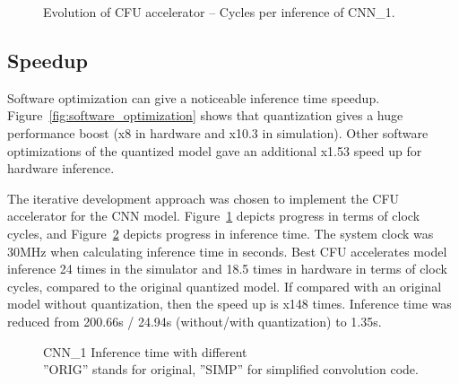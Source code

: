 \begin{figure}[h!]
    \begin{center}
     \scalebox{0.8}{
        
     }
    \end{center}
    \caption{Evolution of CFU accelerator -- Cycles per inference of CNN\_1.}
    \label{fig:cfu_cycles_evolution}
\end{figure}


\subsection{Speedup}
Software optimization can give a noticeable inference time speedup. Figure~\ref{fig:software_optimization} shows that quantization gives a huge performance boost (x8 in hardware and x10.3 in simulation). Other software optimizations of the quantized model gave an additional x1.53 speed up for hardware inference. 

The iterative development approach was chosen to implement the CFU accelerator for the CNN model. Figure~\ref{fig:cfu_cycles_evolution} depicts progress in terms of clock cycles, and Figure~\ref{fig:cfu_inference_time} depicts progress in inference time. The system clock was 30MHz when calculating inference time in seconds. Best CFU accelerates model inference 24 times in the simulator and 18.5 times in hardware in terms of clock cycles, compared to the original quantized model. If compared with an original model without quantization, then the speed up is x148 times. Inference time was reduced from 200.66s / 24.94s (without/with quantization) to 1.35s.


\begin{figure}[h!]
    \begin{center}
    \scalebox{1.0}{
        
    }
    \end{center}
    \caption{CNN\_1 Inference time with different\\''ORIG'' stands for original, ''SIMP'' for simplified convolution code.}
    \label{fig:cfu_inference_time}
\end{figure}



        
